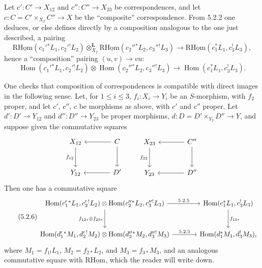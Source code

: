 \documentclass[11pt]{article}
\DeclareMathOperator{\Hom}{Hom}
\providecommand{\Hom}{\operatorname{Hom}}
\providecommand{\Hom}{\operatorname{Hom}}
\begin{document}
Let $c':C'\to X_{12}$ and $c'':C''\to X_{23}$ be correspondences, and let $c:C=C'\times_{X_2}C''\to X$ be the ``composite'' correspondence. From 5.2.2 one deduces, or else defines directly by a composition analogous to the one just described, a pairing
\begin{equation}
\tag{5.2.4}
\mathrm{R}\underline{\mathrm{Hom}}(c_1'{}^*L_1,c_2'{}^!L_2)\otimes_{X_2}^{\mathbf L}\mathrm{R}\underline{\mathrm{Hom}}(c_2''{}^*L_2,c_3''{}^!L_3)
\longrightarrow\mathrm{R}\underline{\mathrm{Hom}}(c_1^*L_1,c_3^!L_3),
\end{equation}
hence a ``composition'' pairing $(u,v)\longrightarrow vu$:
\begin{equation}
\tag{5.2.5}
\Hom(c_1'{}^*L_1,c_2'{}^!L_2)\otimes\Hom(c_2''{}^*L_2,c_3''{}^!L_3)
\longrightarrow\Hom(c_1^*L_1,c_3^!L_3).
\end{equation}

One checks that composition of correspondences is compatible with direct images in the following sense. Let, for $1\leq i\leq 3$, $f_i:X_i\to Y_i$ be an $S$-morphism, with $f_2$ proper, and let $c'$, $c''$, $c$ be morphisms as above, with $c'$ and $c''$ proper. Let $d':D'\to Y_{12}$ and $d'':D''\to Y_{23}$ be proper morphisms, $d:D=D'\times_{Y_2}D''\to Y$, and suppose given the commutative squares
\[
\begin{tikzcd}[column sep=large,row sep=large]
X_{12} \arrow[d,"f_{12}"'] & C \arrow[l] \arrow[d] \\
Y_{12} & D' \arrow[l]
\end{tikzcd}
\qquad
\begin{tikzcd}[column sep=large,row sep=large]
X_{23} \arrow[d,"f_{23}"'] & C'' \arrow[l] \arrow[d] \\
Y_{23} & D'' \arrow[l]
\end{tikzcd}
\]
Then one has a commutative square
\begin{equation}
\tag{5.2.6}
\begin{tikzcd}[column sep=large,row sep=large]
\Hom(c_1'{}^*L_1,c_2'{}^!L_2)\otimes\Hom(c_2''{}^*L_2,c_3''{}^!L_3) \arrow[r,"5.2.5"] \arrow[d,"f_{12*}\otimes f_{23*}"']
& \Hom(c_1^*L_1,c_3^!L_3) \arrow[d,"f_{13*}"] \\
\Hom(d_1'{}^*M_1,d_2'{}^!M_2)\otimes\Hom(d_2''{}^*M_2,d_3''{}^!M_3) \arrow[r,"5.2.5"]
& \Hom(d_1^*M_1,d_3^!M_3),
\end{tikzcd}
\end{equation}
where $M_1=f_{1!}L_1$, $M_2=f_{2*}L_2$, and $M_3=f_{3*}M_3$, and an analogous commutative square with $\mathrm{R}\underline{\mathrm{Hom}}$, which the reader will write down.
\end{document}
